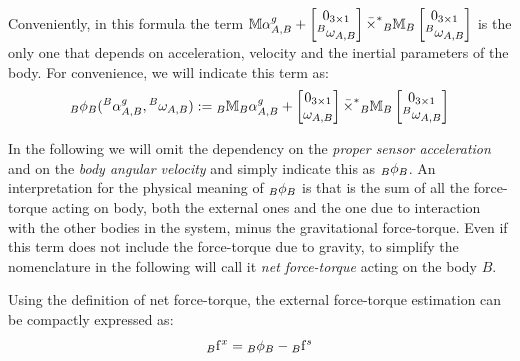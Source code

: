 Conveniently, in this formula the term $\mathbb{M} \alpha^g_{A,B} + \begin{bmatrix} 
0_{3\times1} \\
\hspace{0em}^B \omega_{A,B} 
\end{bmatrix}
\bar{\times}^*
\hspace{0em}_B \mathbb{M}_B
\begin{bmatrix} 
0_{3\times1} \\
\hspace{0em}^B \omega_{A,B} 
\end{bmatrix}$ is the only one that depends  on acceleration, velocity and the inertial parameters of the body. For convenience, we will indicate this term as:
\begin{equation}
\hspace{0em}_B \phi_B( \hspace{0em}^B \alpha^g_{A,B}, \hspace{0em}^B \omega_{A,B}) := \hspace{0em}_B \mathbb{M}_B \alpha^g_{A,B} + \begin{bmatrix} 
0_{3\times1} \\
\omega_{A,B} 
\end{bmatrix}
\bar{\times}^*
\hspace{0em}_B \mathbb{M}_B
\begin{bmatrix} 
0_{3\times1} \\
\hspace{0em}^B \omega_{A,B} 
\end{bmatrix}
\end{equation}

In the following we will omit the dependency on the \emph{proper sensor acceleration} and on the \emph{body angular velocity} and simply indicate this as $\hspace{0em}_B \phi_B$. An interpretation for the physical meaning of $\hspace{0em}_B \phi_B$ is that is the sum of all the force-torque acting on body, both the external ones and the one due to interaction with the other bodies in the system, minus the gravitational force-torque. Even if this term does not include the force-torque due to gravity, to simplify the nomenclature in the following will call it \emph{net force-torque} acting on the body $B$.

Using the definition of net force-torque, the external force-torque estimation can be compactly expressed as:
\begin{equation}
\label{eq:extforce-torque}
    \hspace{0em}_B {\rm f}^x = \hspace{0em}_B \phi_B -   \hspace{0em}_B {\rm f}^s 
\end{equation}

